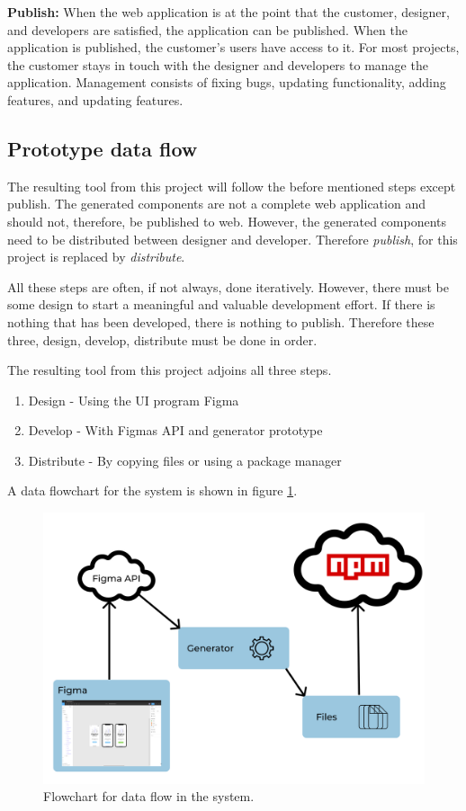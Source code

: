 \textbf{Publish:} When the web application is at the point that the customer, designer, and developers are satisfied, the application can be published. When the application is published, the customer's users have access to it. For most projects, the customer stays in touch with the designer and developers to manage the application. Management consists of fixing bugs, updating functionality, adding features, and updating features.

\subsection{Prototype data flow}%
\label{sub:Prototype data flow}
The resulting tool from this project will follow the before mentioned steps except publish. The generated \glspl{component} are not a complete web application and should not, therefore, be published to web. However, the generated \glspl{component} need to be distributed between designer and developer. Therefore \textit{publish}, for this project is replaced by \textit{distribute}. 

All these steps are often, if not always, done iteratively. However, there must be some design to start a meaningful and valuable development effort. If there is nothing that has been developed, there is nothing to publish. Therefore these three, design, develop, distribute must be done in order. 

The resulting tool from this project adjoins all three steps. 
\begin{enumerate}
  \item Design - Using the UI program Figma
  \item Develop - With Figmas API and generator prototype
  \item Distribute - By copying files or using a package manager 
\end{enumerate}
A data flowchart for the system is shown in figure \ref{fig:flow}.

\begin{figure}[H]
  \centering
  \includegraphics[width=0.8\linewidth]{images/flow2.png}
  \caption{Flowchart for data flow in the system.}%
  \label{fig:flow}
\end{figure}


